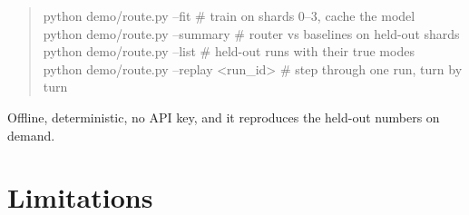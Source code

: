 \documentclass[10pt]{article}
\begin{document}
\begin{quote}\small\ttfamily
python demo/route.py --fit \# train on shards 0--3, cache the model\\
python demo/route.py --summary \# router vs baselines on held-out shards\\
python demo/route.py --list \# held-out runs with their true modes\\
python demo/route.py --replay <run\_id> \# step through one run, turn by turn
\end{quote}

\noindent Offline, deterministic, no API key, and it reproduces the held-out numbers on demand.

\section{Limitations}
\end{document}
